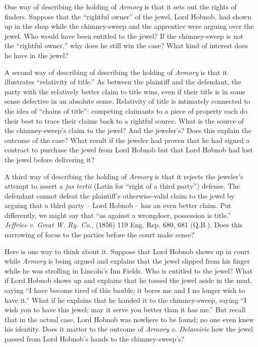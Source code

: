 
\item One way of describing the holding of \textit{Armory} is that it sets out
the rights of finders. Suppose that the ``rightful owner'' of the jewel, Lord
Hobnob, had shown up in the shop while the chimney-sweep and the apprentice
were arguing over the jewel. Who would have been entitled to the jewel? If the
chimney-sweep is not the ``rightful owner,'' why does he still win the case?
What kind of interest does he have in the jewel?

\item A second way of describing of describing the holding of \textit{Armory} is
that it illustrates ``relativity of title.'' As between the plaintiff and the
defendant, the party with the relatively better claim to title wins, even if
their title is in some sense defective in an absolute sense. Relativity of
title is intimately connected to the idea of ``chains of title'': competing
claimants to a piece of property each do their best to trace their claims back
to a rightful source. What is the source of the chimney-sweep's claim to the
jewel? And the jeweler's? Does this explain the outcome of the case? What
result if the jeweler had proven that he had signed a contract to purchase the
jewel from Lord Hobnob but that Lord Hobnob had lost the jewel before
delivering it?

\item A third way of describing the holding of \textit{Armory} is that it
rejects the jeweler's attempt to assert a \textit{jus tertii} (Latin for
``right of a third party'') defense. The defendant cannot defeat the
plaintiff's otherwise-valid claim to the jewel by arguing that a third party --
Lord Hobnob -- has an even better claim. Put differently, we might say that
``as against a wrongdoer, possession is title.'' \textit{Jeffries v. Great W.
Ry. Co.}, (1856) 119 Eng. Rep. 680, 681 (Q.B.). Does this narrowing of focus to
the parties before the court make sense? 

Here is one way to think about it. Suppose that Lord Hobnob shows up in court
while \textit{Armory} is being argued and explains that the jewel slipped from
his finger while he was strolling in Lincoln's Inn Fields. Who is entitled to
the jewel? What if Lord Hobnob shows up and explains that he tossed the jewel
aside in the mud, saying ``I have become tired of this bauble; it bores me and
I no longer wish to have it.'' What if he explains that he handed it to the
chimney-sweep, saying ``I wish you to have this jewel; may it serve you better
than it has me.'' But recall that in the actual case, Lord Hobnob was nowhere
to be found; no one even knew his identity. Does it matter to the outcome of
\textit{Armory v. Delamirie} how the jewel passed from Lord Hobnob's hands to
the chimney-sweep's? 

